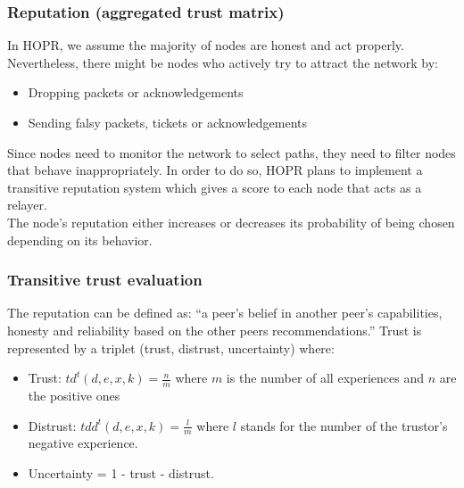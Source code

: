 \subsubsection{Reputation (aggregated trust matrix)}

In HOPR, we assume the majority of nodes are honest and act properly. Nevertheless, there might be nodes who actively try to attract the network by:
\begin{itemize}
    \item Dropping packets or acknowledgements
    \item Sending falsy packets, tickets or acknowledgements
\end{itemize}
Since nodes need to monitor the network to select paths, they need to filter nodes that behave inappropriately. 
In order to do so, HOPR plans to implement a transitive reputation system which gives a score to each node that acts as a relayer. 
\\The node’s reputation either increases or decreases its probability of being chosen depending on its behavior.

\subsubsection*{Transitive trust evaluation }  
The reputation can be defined as: “a peer’s belief in another peer’s capabilities, honesty and reliability based on the other peers recommendations.”
Trust is represented by a triplet (trust, distrust, uncertainty) where:
\begin{itemize}
    \item Trust: $td^t(d,e,x,k)=\frac{n}{m}$ where $m$ is the number of all experiences and $n$ are the positive ones
    \item Distrust: $tdd^t(d,e,x,k)=\frac{l}{m}$ where $l$ stands for the number of the trustor’s negative experience.
    \item Uncertainty = 1 - trust - distrust.
\end{itemize}

